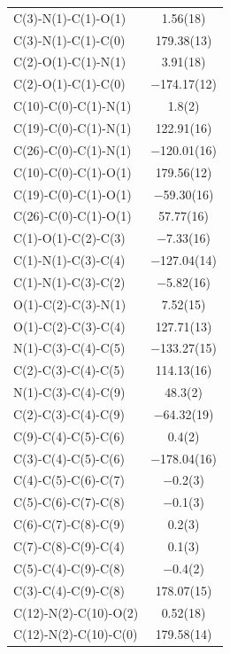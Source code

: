 \begin{center}
\tablefirsthead{%
\toprule}
\tablelasttail{\bottomrule}
{\footnotesize \singlespacing
\begin{supertabular}{p{1.5in}c}
C(3)-N(1)-C(1)-O(1)&1.56(18)\\
C(3)-N(1)-C(1)-C(0)&179.38(13)\\
C(2)-O(1)-C(1)-N(1)&3.91(18)\\
C(2)-O(1)-C(1)-C(0)&$-$174.17(12)\\
C(10)-C(0)-C(1)-N(1)&1.8(2)\\
C(19)-C(0)-C(1)-N(1)&122.91(16)\\
C(26)-C(0)-C(1)-N(1)&$-$120.01(16)\\
C(10)-C(0)-C(1)-O(1)&179.56(12)\\
C(19)-C(0)-C(1)-O(1)&$-$59.30(16)\\
C(26)-C(0)-C(1)-O(1)&57.77(16)\\
C(1)-O(1)-C(2)-C(3)&$-$7.33(16)\\
C(1)-N(1)-C(3)-C(4)&$-$127.04(14)\\
C(1)-N(1)-C(3)-C(2)&$-$5.82(16)\\
O(1)-C(2)-C(3)-N(1)&7.52(15)\\
O(1)-C(2)-C(3)-C(4)&127.71(13)\\
N(1)-C(3)-C(4)-C(5)&$-$133.27(15)\\
C(2)-C(3)-C(4)-C(5)&114.13(16)\\
N(1)-C(3)-C(4)-C(9)&48.3(2)\\
C(2)-C(3)-C(4)-C(9)&$-$64.32(19)\\
C(9)-C(4)-C(5)-C(6)&0.4(2)\\
C(3)-C(4)-C(5)-C(6)&$-$178.04(16)\\
C(4)-C(5)-C(6)-C(7)&$-$0.2(3)\\
C(5)-C(6)-C(7)-C(8)&$-$0.1(3)\\
C(6)-C(7)-C(8)-C(9)&0.2(3)\\
C(7)-C(8)-C(9)-C(4)&0.1(3)\\
C(5)-C(4)-C(9)-C(8)&$-$0.4(2)\\
C(3)-C(4)-C(9)-C(8)&178.07(15)\\
C(12)-N(2)-C(10)-O(2)&0.52(18)\\
C(12)-N(2)-C(10)-C(0)&179.58(14)\\

\end{supertabular}}
\end{center}
